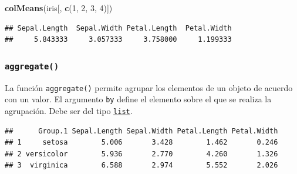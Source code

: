 \documentclass[
]{book}
\newenvironment{Shaded}{\begin{snugshade}}{\end{snugshade}}
\newcommand{\DataTypeTok}[1]{\textcolor[rgb]{0.13,0.29,0.53}{#1}}
\newcommand{\DecValTok}[1]{\textcolor[rgb]{0.00,0.00,0.81}{#1}}
\newcommand{\KeywordTok}[1]{\textcolor[rgb]{0.13,0.29,0.53}{\textbf{#1}}}
\newcommand{\NormalTok}[1]{#1}
\newcommand{\OperatorTok}[1]{\textcolor[rgb]{0.81,0.36,0.00}{\textbf{#1}}}
\begin{document}
\begin{Shaded}
\begin{Highlighting}[]
\KeywordTok{colMeans}\NormalTok{(iris[, }\KeywordTok{c}\NormalTok{(}\DecValTok{1}\NormalTok{, }\DecValTok{2}\NormalTok{, }\DecValTok{3}\NormalTok{, }\DecValTok{4}\NormalTok{)])}
\end{Highlighting}
\end{Shaded}

\begin{verbatim}
## Sepal.Length  Sepal.Width Petal.Length  Petal.Width 
##     5.843333     3.057333     3.758000     1.199333
\end{verbatim}

\hypertarget{l015aggregate}{%
\subsubsection{\texorpdfstring{\texttt{aggregate()}}{aggregate()}}\label{l015aggregate}}

La función \texttt{aggregate()} permite agrupar los elementos de un objeto de acuerdo con un valor. El argumento \texttt{by} define el elemento sobre el que se realiza la agrupación. Debe ser del tipo \protect\hyperlink{l014list}{\texttt{list}}.

\begin{Shaded}
\end{Shaded}

\begin{verbatim}
##      Group.1 Sepal.Length Sepal.Width Petal.Length Petal.Width
## 1     setosa        5.006       3.428        1.462       0.246
## 2 versicolor        5.936       2.770        4.260       1.326
## 3  virginica        6.588       2.974        5.552       2.026
\end{verbatim}

\begin{Shaded}
\end{Shaded}
\end{document}
